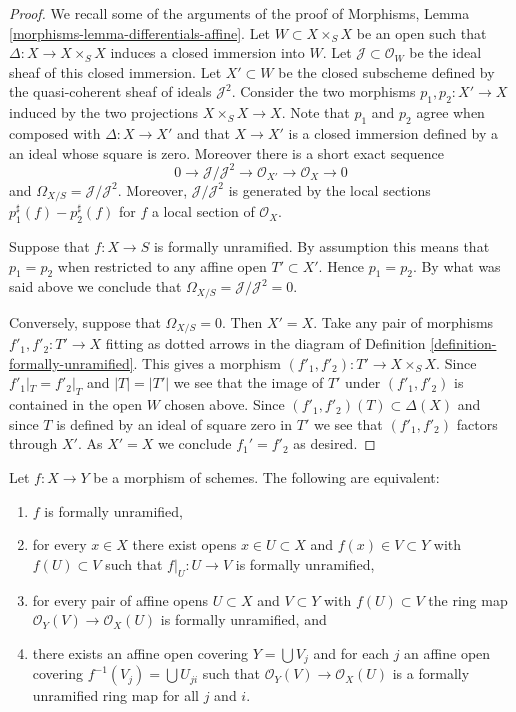 \begin{proof}
We recall some of the arguments of the proof of
Morphisms, Lemma \ref{morphisms-lemma-differentials-affine}.
Let $W \subset X \times_S X$ be an open such that
$\Delta : X \to X \times_S X$ induces a closed immersion into $W$.
Let $\mathcal{J} \subset \mathcal{O}_W$ be the ideal sheaf of this
closed immersion. Let $X' \subset W$ be the closed subscheme
defined by the quasi-coherent sheaf of ideals $\mathcal{J}^2$.
Consider the two morphisms $p_1, p_2 : X' \to X$ induced by
the two projections $X \times_S X \to X$.
Note that $p_1$ and $p_2$ agree when composed with $\Delta : X \to X'$
and that $X \to X'$ is a closed immersion defined by a an ideal
whose square is zero. Moreover there is a short exact sequence
$$
0 \to \mathcal{J}/\mathcal{J}^2 \to \mathcal{O}_{X'} \to \mathcal{O}_X \to 0
$$
and $\Omega_{X/S} = \mathcal{J}/\mathcal{J}^2$. Moreover,
$\mathcal{J}/\mathcal{J}^2$ is generated by the local
sections $p_1^\sharp(f) - p_2^\sharp(f)$ for $f$ a local section of
$\mathcal{O}_X$.

\medskip\noindent
Suppose that $f : X \to S$ is formally unramified.
By assumption this means that $p_1 = p_2$ when restricted to any
affine open $T' \subset X'$. Hence $p_1 = p_2$. By what was said above
we conclude that $\Omega_{X/S} = \mathcal{J}/\mathcal{J}^2 = 0$.

\medskip\noindent
Conversely, suppose that $\Omega_{X/S} = 0$. Then $X' = X$. Take any pair
of morphisms $f'_1, f'_2 : T' \to X$ fitting as dotted arrows in
the diagram of
Definition \ref{definition-formally-unramified}.
This gives a morphism $(f'_1, f'_2) : T' \to X \times_S X$.
Since $f'_1|_T = f'_2|_T$ and $|T| =|T'|$ we see that the image of $T'$
under $(f'_1, f'_2)$ is contained in the open $W$ chosen above. Since
$(f'_1, f'_2)(T) \subset \Delta(X)$ and since $T$ is defined by an ideal
of square zero in $T'$ we see that $(f'_1, f'_2)$ factors through $X'$.
As $X' = X$ we conclude $f_1' = f'_2$ as desired.
\end{proof}

\begin{lemma}
\label{lemma-formally-unramified}
Let $f : X \to Y$ be a morphism of schemes. The following are equivalent:
\begin{enumerate}
\item $f$ is formally unramified,
\item for every $x \in X$ there exist opens $x \in U \subset X$ and
$f(x) \in V \subset Y$ with $f(U) \subset V$ such that
$f|_U : U \to V$ is formally unramified,
\item for every pair of affine opens $U \subset X$ and $V \subset Y$
with $f(U) \subset V$ the ring map $\mathcal{O}_Y(V) \to \mathcal{O}_X(U)$
is formally unramified, and
\item there exists an affine open covering $Y = \bigcup V_j$ and
for each $j$ an affine open covering $f^{-1}(V_j) = \bigcup U_{ji}$
such that $\mathcal{O}_Y(V) \to \mathcal{O}_X(U)$ is a formally unramified
ring map for all $j$ and $i$.
\end{enumerate}
\end{lemma}

